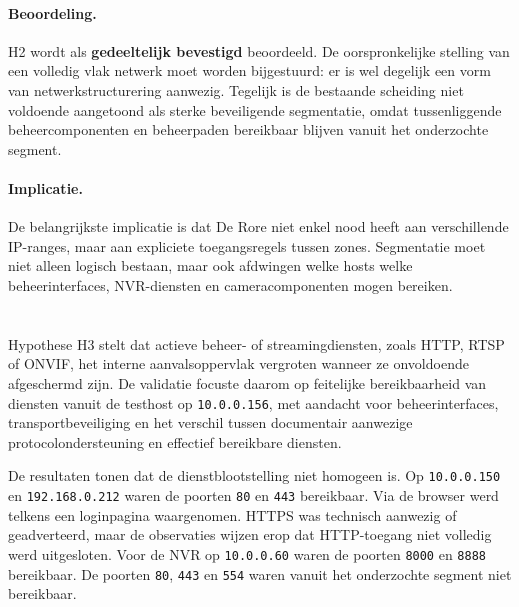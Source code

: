 \paragraph{Beoordeling.}
H2 wordt als \textbf{gedeeltelijk bevestigd} beoordeeld. De oorspronkelijke stelling van een volledig vlak netwerk moet worden bijgestuurd: er is wel degelijk een vorm van netwerkstructurering aanwezig. Tegelijk is de bestaande scheiding niet voldoende aangetoond als sterke beveiligende segmentatie, omdat tussenliggende beheercomponenten en beheerpaden bereikbaar blijven vanuit het onderzochte segment.

\paragraph{Implicatie.}
De belangrijkste implicatie is dat De Rore niet enkel nood heeft aan verschillende IP-ranges, maar aan expliciete toegangsregels tussen zones. Segmentatie moet niet alleen logisch bestaan, maar ook afdwingen welke hosts welke beheerinterfaces, NVR-diensten en cameracomponenten mogen bereiken.



\section{}%
\label{sec:h3-diensten}

Hypothese H3 stelt dat actieve beheer- of streamingdiensten, zoals HTTP, RTSP of ONVIF, het interne aanvalsoppervlak vergroten wanneer ze onvoldoende afgeschermd zijn. De validatie focuste daarom op feitelijke bereikbaarheid van diensten vanuit de testhost op \texttt{10.0.0.156}, met aandacht voor beheerinterfaces, transportbeveiliging en het verschil tussen documentair aanwezige protocolondersteuning en effectief bereikbare diensten.

De resultaten tonen dat de dienstblootstelling niet homogeen is. Op \texttt{10.0.0.150} en \texttt{192.168.0.212} waren de poorten \texttt{80} en \texttt{443} bereikbaar. Via de browser werd telkens een loginpagina waargenomen. HTTPS was technisch aanwezig of geadverteerd, maar de observaties wijzen erop dat HTTP-toegang niet volledig werd uitgesloten. Voor de NVR op \texttt{10.0.0.60} waren de poorten \texttt{8000} en \texttt{8888} bereikbaar. De poorten \texttt{80}, \texttt{443} en \texttt{554} waren vanuit het onderzochte segment niet bereikbaar.

